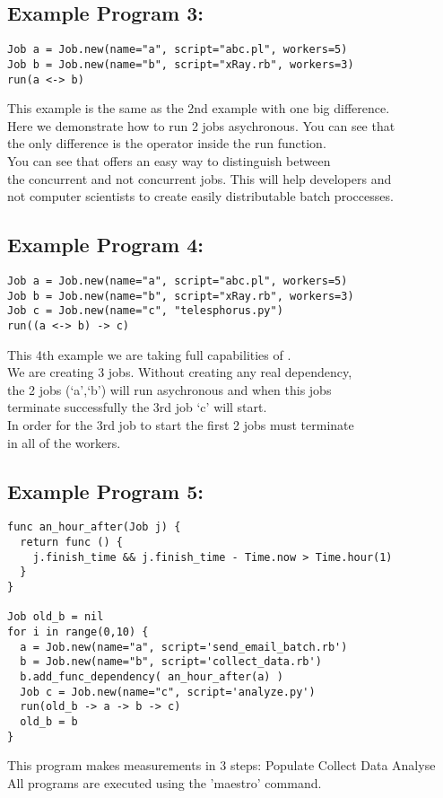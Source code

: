 \subsection*{Example Program 3:}
\begin{verbatim}
Job a = Job.new(name="a", script="abc.pl", workers=5)
Job b = Job.new(name="b", script="xRay.rb", workers=3)
run(a <-> b)
\end{verbatim}

This example is the same as the 2nd example with one big difference.\\
Here we demonstrate how to run 2 jobs asychronous. You can see that\\
the only difference is the operator inside the run function.\\

You can see that \lang{} offers an easy way to distinguish between\\
the concurrent and not concurrent jobs. This will help developers and\\
not computer scientists to create easily distributable batch proccesses.\\

\subsection*{Example Program 4:}
\begin{verbatim}
Job a = Job.new(name="a", script="abc.pl", workers=5)
Job b = Job.new(name="b", script="xRay.rb", workers=3)
Job c = Job.new(name="c", "telesphorus.py")
run((a <-> b) -> c)
\end{verbatim}

This 4th example we are taking full capabilities of \lang{}.\\
We are creating 3 jobs. Without creating any real dependency,\\
the 2 jobs (`a',`b') will run asychronous and when this jobs\\
terminate successfully the 3rd job `c' will start.\\
In order for the 3rd job to start the first 2 jobs must terminate\\
in all of the workers.\\

\subsection*{Example Program 5:}
\begin{verbatim}
func an_hour_after(Job j) {
  return func () {
    j.finish_time && j.finish_time - Time.now > Time.hour(1)
  }
}

Job old_b = nil
for i in range(0,10) {
  a = Job.new(name="a", script='send_email_batch.rb')
  b = Job.new(name="b", script='collect_data.rb')
  b.add_func_dependency( an_hour_after(a) )
  Job c = Job.new(name="c", script='analyze.py')
  run(old_b -> a -> b -> c)
  old_b = b
}
\end{verbatim}
This program makes measurements in 3 steps:
Populate
Collect Data
Analyse
\\

All programs are executed using the 'maestro' command.
\\

